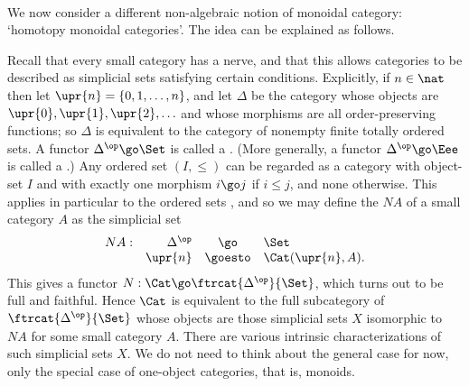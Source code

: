 \paragraph*{}


We now consider a different non-algebraic notion of monoidal category:
`homotopy monoidal categories'.  The idea can be explained as follows.

Recall that every small category has a nerve, and that this allows
categories to be described as simplicial sets satisfying certain
conditions.  Explicitly, if $n\in\nat$ then let $\upr{n} = \{ 0, 1, \ldots,
n \}$,%
% 
% 
and let $\Delta$%
% 
% 
be the category whose objects are $\upr{0},
\upr{1}, \upr{2}, \ldots$ and whose morphisms are all order-preserving
functions; so $\Delta$ is equivalent to the category of nonempty finite
totally ordered sets.  A functor $\Delta^\op \go \Set$ is called a
.  (More generally, a functor $\Delta^\op \go \Eee$
is called a .)  Any ordered set $(I,
\leq)$ can be regarded as a category with object-set $I$ and with exactly
one morphism $i \go j$ if $i\leq j$, and none otherwise.  This applies in
particular to the ordered sets , and so we may define the
% 
%
%
$NA$ of a small category $A$ as the simplicial set
\[
\begin{array}{rrcl}
NA: 	&\Delta^\op	&\go 		&\Set			\\
	&\upr{n}	&\goesto	&\Cat(\upr{n}, A).
\end{array}
\]
This gives a functor $N: \Cat \go \ftrcat{\Delta^\op}{\Set}$, which turns
out to be full and faithful.  Hence $\Cat$ is equivalent to the full
subcategory of $\ftrcat{\Delta^\op}{\Set}$ whose objects are those
simplicial sets $X$ isomorphic to $NA$ for some small category $A$.  There
are various intrinsic characterizations of such simplicial sets $X$.  We do
not need to think about the general case for now, only the special case of
one-object categories, that is, monoids.

